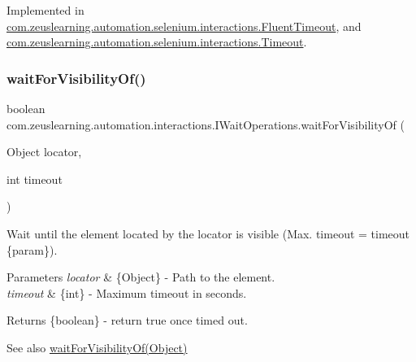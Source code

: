 Implemented in \hyperlink{classcom_1_1zeuslearning_1_1automation_1_1selenium_1_1interactions_1_1FluentTimeout_a189fae4d5e9985013b0e1b65c3d73d1f}{com.\+zeuslearning.\+automation.\+selenium.\+interactions.\+Fluent\+Timeout}, and \hyperlink{classcom_1_1zeuslearning_1_1automation_1_1selenium_1_1interactions_1_1Timeout_a327e77cb8ede06a2f7eef9d765812b7a}{com.\+zeuslearning.\+automation.\+selenium.\+interactions.\+Timeout}.

\hypertarget{interfacecom_1_1zeuslearning_1_1automation_1_1interactions_1_1IWaitOperations_a608da544ffa2ea81c99c5cb17e8e60ba}{}\label{interfacecom_1_1zeuslearning_1_1automation_1_1interactions_1_1IWaitOperations_a608da544ffa2ea81c99c5cb17e8e60ba} 
\subsubsection{\texorpdfstring{wait\+For\+Visibility\+Of()}{waitForVisibilityOf()}\hspace{0.1cm}{\footnotesize\ttfamily [2/2]}}
{\footnotesize\ttfamily boolean com.\+zeuslearning.\+automation.\+interactions.\+I\+Wait\+Operations.\+wait\+For\+Visibility\+Of (\begin{DoxyParamCaption}\item[{Object}]{locator,  }\item[{int}]{timeout }\end{DoxyParamCaption})}

Wait until the element located by the locator is visible (Max. timeout = timeout \{param\}).


\begin{DoxyParams}{Parameters}
{\em locator} & \{Object\} -\/ Path to the element. \\
\hline
{\em timeout} & \{int\} -\/ Maximum timeout in seconds.\\
\hline
\end{DoxyParams}
\begin{DoxyReturn}{Returns}
\{boolean\} -\/ return {\ttfamily true} once timed out.
\end{DoxyReturn}
\begin{DoxySeeAlso}{See also}
\hyperlink{interfacecom_1_1zeuslearning_1_1automation_1_1interactions_1_1IWaitOperations_ad52fa72b8387c5172714bdec02b754a9}{wait\+For\+Visibility\+Of(\+Object)} 
\end{DoxySeeAlso}


